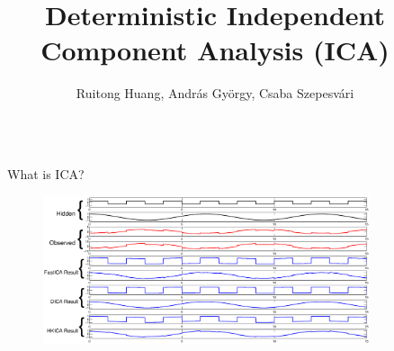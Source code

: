 \documentclass[final]{beamer} %
\title{Deterministic Independent Component Analysis (ICA)}
\author{Ruitong Huang, Andr\'as Gy\"orgy, Csaba Szepesv\'{a}ri}
\begin{document}
\begin{frame}[c]
	\vspace{-1.5cm}

	\begin{columns}[t,totalwidth=\textwidth]
	
	\begin{column}{0.01\textwidth}
	\end{column}

		
 	\begin{column}{.24\textwidth}%
	
		\begin{block}{What is ICA?}
			\begin{figure}
				\includegraphics[width = 0.9\textwidth]{demo}
			\end{figure}
			\vspace{-0.5cm} 					
		\end{block}
		\vspace{0.5ex}


\end{column}
\end{columns}
\end{frame}
\end{document}
